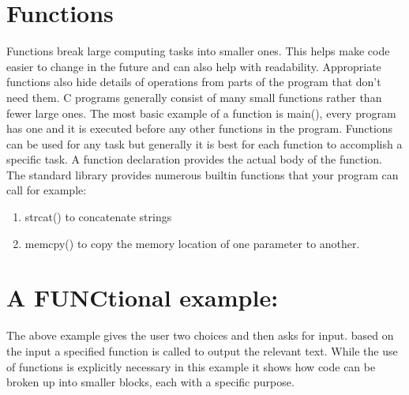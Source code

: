 \documentclass[
	12pt, %
]{fphw}
\begin{document}
\section*{Functions}
Functions break large computing tasks into smaller ones. This helps make code 
easier to change in the future and can also help  with readability. Appropriate 
functions also hide details of operations from parts of the program that don't 
need them. C programs generally consist of many small functions rather than fewer 
large ones. The most basic example of a function is main(), every program has one 
and it is executed before any other functions in the program. Functions can be 
used for any task but generally it is best for each function to accomplish a 
specific task. A function declaration provides the actual body of the function. \\

The standard library provides numerous builtin functions that your program can call
for example:
\begin{enumerate}
	\item strcat() to concatenate strings
	\item memcpy() to copy the memory location of one parameter to another.
\end{enumerate}


\section*{A FUNCtional example:}

\begin{problem}
	
\end{problem}


The above example gives the user two choices and then asks for input. based on
the input a specified function is called to output the relevant text. While the 
use of functions is explicitly necessary in this example it shows how code can be
broken up into smaller blocks, each with a specific purpose.
\end{document}
